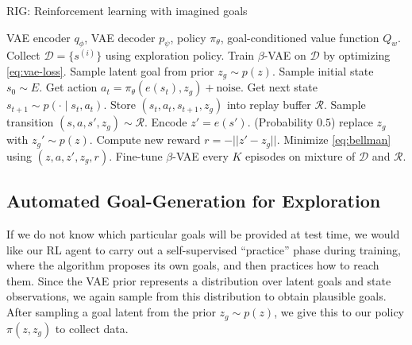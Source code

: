 \begin{algorithm}
   	\footnotesize
   	\caption{RIG: Reinforcement learning with imagined goals}
   	\label{alg:tbd}
   	\begin{multicols}{2}
   	\begin{algorithmic}[1]
    \REQUIRE VAE encoder $q_\phi$, VAE decoder $p_\psi$, policy $\pi_\theta$, goal-conditioned value function $Q_w$.
    \STATE Collect $\mathcal D = \{s^{(i)}\}$ using exploration policy.
    \STATE Train $\beta$-VAE on $\mathcal D$ by optimizing \eqref{eq:vae-loss}.
        \STATE Sample latent goal from prior $z_g \sim p(z)$.
        \STATE Sample initial state $s_0 \sim E$.
            \STATE Get action $a_t = \pi_\theta(e(s_t), z_g) + \text{noise}$.
            \STATE Get next state $s_{t+1} \sim p(\cdot \mid s_t, a_t)$.
            \STATE Store $(s_t, a_t, s_{t+1}, z_g)$ into replay buffer $\mathcal R$.
            \STATE Sample transition $(s, a, s', z_g) \sim \mathcal R$.
            \STATE Encode $z' = e(s')$.
            \STATE (Probability $0.5$) replace $z_g$ with $z_g' \sim p(z)$.
            \STATE Compute new reward $r = -||z' - z_g||$.
            \STATE Minimize \eqref{eq:bellman} using $(z, a, z', z_g, r)$.
        \ENDFOR
        \STATE Fine-tune $\beta$-VAE every $K$ episodes on mixture of $\mathcal D$ and $\mathcal R$.
    \ENDFOR
   	\end{algorithmic}
   	\end{multicols}
   	\vspace{-0.15in}
\end{algorithm}

\subsection{Automated Goal-Generation for Exploration}
If we do not know which particular goals will be provided at test time, we would like our RL agent to carry out a self-supervised ``practice'' phase during training, where the algorithm proposes its own goals, and then practices how to reach them.
Since the VAE prior represents a distribution over latent goals and state observations, we again sample from this distribution to obtain plausible goals.
After sampling a goal latent from the prior $z_g \sim p(z)$, we give this to our policy $\pi(z, z_g)$ to collect data.

